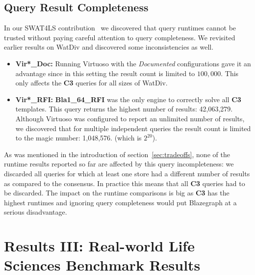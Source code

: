 \documentclass[twocolumn]{bmcart}%
\begin{document}
\subsection{Query Result Completeness}
\label{subsec:completeness}
%


In our SWAT4LS contribution~\cite{dewitte_swat4ls_2016} we discovered that query runtimes cannot be trusted without paying careful attention to query completeness. We revisited earlier results on WatDiv and discovered some inconsistencies as well.
\begin{itemize}
	\item \textbf{Vir*\_Doc:} Running Virtuoso with the \emph{Documented} configurations gave it an advantage since in this setting the result count is limited to $100,000$. This only affects the \textbf{C3} queries for all sizes of WatDiv.
	\item \textbf{Vir*\_RFI:} \textbf{Bla1\_64\_RFI} was the only engine to correctly solve all \textbf{C3} templates. This query returns the highest number of results: 42,063,279. Although Virtuoso was configured to report an unlimited number of results, we discovered that for multiple independent queries the result count is limited to the magic number: 1,048,576. (which is $2^{20}$).  
\end{itemize}
As was mentioned in the introduction of section~\ref{sec:tradeoffs}, none of the runtime results reported so far are affected by this query incompleteness: we discarded all queries for which at least one store had a different number of results as compared to the consensus. In practice this means that all \textbf{C3} queries had to be discarded. The impact on the runtime comparisons is big as \textbf{C3} has the highest runtimes and ignoring query completeness would put Blazegraph at a serious disadvantage.



\section{Results III: Real-world Life Sciences Benchmark Results}
\label{sec:realworld}
%
\end{document}
